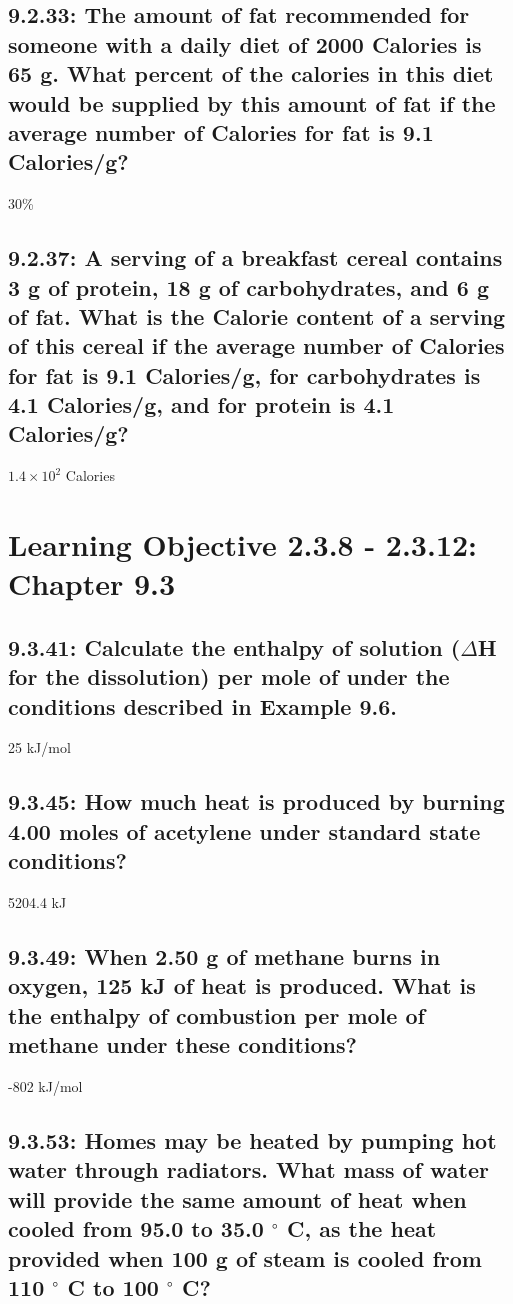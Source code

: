 \documentclass[11pt, letterpaper]{article}
\newcommand{\degree}{\ensuremath{{}^{\circ}}\xspace}
\begin{document}
\subsection*{9.2.33: The amount of fat recommended for someone with a daily
diet of 2000 Calories is 65 g. What percent of the calories in this diet 
would be supplied by this amount of fat if the average number of Calories for fat is
9.1 Calories/g?}

30\%

\subsection*{9.2.37: A serving of a breakfast cereal contains 3 g of protein, 
18 g of carbohydrates, and 6 g of fat. What is the Calorie content of a 
serving of this cereal if the average number of Calories for fat is 
9.1 Calories/g, for carbohydrates is 4.1 Calories/g, 
and for protein is 4.1 Calories/g?}

$1.4 \times 10^{2}$ Calories

\section*{Learning Objective 2.3.8 - 2.3.12: Chapter 9.3}


\subsection*{9.3.41: Calculate the enthalpy of solution 
($\Delta$H for the dissolution) per mole of  under the 
conditions described in Example 9.6.}

25 kJ/mol

\subsection*{9.3.45: How much heat is produced by burning 4.00 
moles of acetylene under standard state conditions?}

5204.4 kJ

\subsection*{9.3.49: When 2.50 g of methane burns in oxygen, 125 kJ 
of heat is produced. What is the enthalpy of combustion per mole 
of methane under these conditions?}

-802 kJ/mol

\subsection*{9.3.53: Homes may be heated by pumping hot water through 
radiators. What mass of water will provide the same amount of heat 
when cooled from 95.0 to 35.0 \degree C, as the heat provided when 
100 g of steam is cooled from 110 \degree C to 100 \degree C?}
\end{document}
